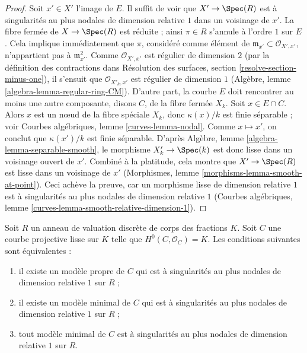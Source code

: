 \begin{proof}
Soit $x'\in X'$ l'image de $E$. Il suffit de voir que
$X'\to\Spec(R)$ est à singularités au plus nodales de dimension relative
$1$ dans un voisinage de $x'$. La fibre fermée de $X\to\Spec(R)$ est
réduite ; ainsi $\pi\in R$ s'annule à l'ordre $1$ sur $E$. Cela implique
immédiatement que $\pi$, considéré comme élément de
$\mathfrak m_{x'}\subset\mathcal{O}_{X',x'}$, n'appartient pas à
$\mathfrak m_{x'}^2$. Comme $\mathcal{O}_{X',x'}$ est régulier de
dimension $2$ (par la définition des contractions dans Résolution des
surfaces, section \ref{resolve-section-minus-one}), il s'ensuit que
$\mathcal{O}_{X'_k,x'}$ est régulier de dimension $1$ (Algèbre, lemme
\ref{algebra-lemma-regular-ring-CM}). D'autre part, la courbe $E$ doit
rencontrer au moins une autre composante, disons $C$, de la fibre fermée
$X_k$. Soit $x\in E\cap C$. Alors $x$ est un nœud de la fibre spéciale
$X_k$, donc $\kappa(x)/k$ est finie séparable ; voir Courbes algébriques,
lemme \ref{curves-lemma-nodal}. Comme $x\mapsto x'$, on conclut que
$\kappa(x')/k$ est finie séparable. D'après Algèbre, lemme
\ref{algebra-lemma-separable-smooth}, le morphisme
$X'_k\to\Spec(k)$ est donc lisse dans un voisinage ouvert de $x'$.
Combiné à la platitude, cela montre que $X'\to\Spec(R)$ est lisse dans un
voisinage de $x'$ (Morphismes, lemme
\ref{morphisms-lemma-smooth-at-point}). Ceci achève la preuve, car un
morphisme lisse de dimension relative $1$ est à singularités au plus
nodales de dimension relative $1$ (Courbes algébriques, lemme
\ref{curves-lemma-smooth-relative-dimension-1}).
\end{proof}

\begin{lemma}
\label{lemma-semistable}
Soit $R$ un anneau de valuation discrète de corps des fractions $K$.
Soit $C$ une courbe projective lisse sur $K$ telle que
$H^0(C,\mathcal{O}_C)=K$. Les conditions suivantes sont équivalentes :
\begin{enumerate}
\item il existe un modèle propre de $C$ qui est à singularités au plus
nodales de dimension relative $1$ sur $R$ ;
\item il existe un modèle minimal de $C$ qui est à singularités au plus
nodales de dimension relative $1$ sur $R$ ;
\item tout modèle minimal de $C$ est à singularités au plus nodales de
dimension relative $1$ sur $R$.
\end{enumerate}
\end{lemma}


